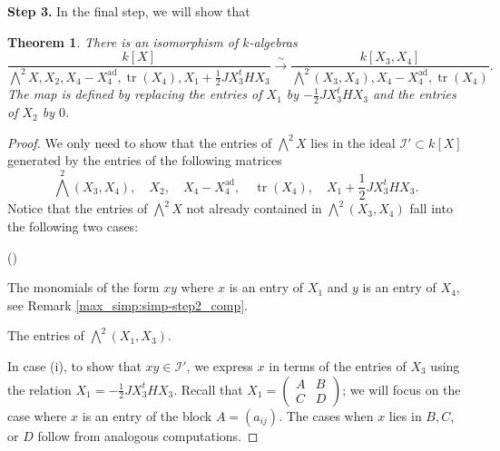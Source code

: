 \documentclass[pdflatex,sn-mathphys-num]{sn-jnl}%
\theoremstyle{thmstyleone}%
\newtheorem{theorem}[subsubsection]{Theorem}%
\theoremstyle{thmstyletwo}%
\numberwithin{equation}{subsection}
\theoremstyle{thmstylethree}%
\newcommand{\CI}{\ensuremath{\mathcal{I}}\xspace}
\newcommand{\ad}{\mathrm{ad}}
\DeclareMathOperator{\tr}{tr}
\newenvironment{altenumerate}
	{\begin{list}
			{(\theenumi) }
			{\usecounter{enumi}
				\setlength{\labelwidth}{0pt}
				\setlength{\labelsep}{0pt}
				\setlength{\leftmargin}{0pt}
				\setlength{\itemsep}{\the\smallskipamount}
				\renewcommand{\theenumi}{\roman{enumi}}
		}}
		{\end{list}}
\begin{document}
		
\noindent\textbf{Step 3.}
In the final step, we will show that
\begin{theorem}\label{sm:simp_step3_ring}
	There is an isomorphism of $k$-algebras
\begin{equation*}
	\frac{k[X]}{\bigwedge^2 X, X_2, X_4-X_4^{\ad},\tr(X_4), X_1+\frac{1}{2}JX_3^tHX_3}\xrightarrow{\sim} \frac{k[X_3,X_4]}{\bigwedge^2 (X_3,X_4), X_4-X_4^{\ad},\tr(X_4)}.
\end{equation*}
The map is defined by replacing the entries of $X_1$ by $-\frac{1}{2}JX_3^tHX_3$ and the entries of $X_2$ by $0$.
\end{theorem}
\begin{proof}
We only need to show that the entries of $\bigwedge^2 X$ lies in the ideal $\CI'\subset k[X]$ generated by the entries of the following matrices
\[
\bigwedge^2 (X_3,X_4),\quad X_2,\quad X_4-X_4^{\ad},\quad \tr(X_4),\quad X_1+\frac{1}{2}JX_3^tHX_3.
\]
Notice that the entries of $\bigwedge^2 X$ not already contained in $\bigwedge^2(X_3,X_4)$ fall into the following two cases:
\begin{altenumerate}
	\item The monomials of the form $xy$ where $x$ is an entry of  $X_1$ and $y$ is an entry of $X_4$, see Remark \ref{max_simp:simp-step2_comp}.
	\item The entries of $\bigwedge^2(X_1,X_3)$.
\end{altenumerate}
			
In case (i), to show that $xy\in\CI'$, we express $x$ in terms of the entries of $X_3$ using the relation $X_1=-\frac{1}{2}JX_3^tHX_3$.
Recall that $X_1=\left(\begin{matrix}A&B\\C&D\end{matrix}\right)$; 
we will focus on the case where $x$ is an entry of the block $A=(a_{ij})$.
The cases when $x$ lies in $B, C$, or $D$ follow from analogous computations.
			

\end{proof}
\end{document}

